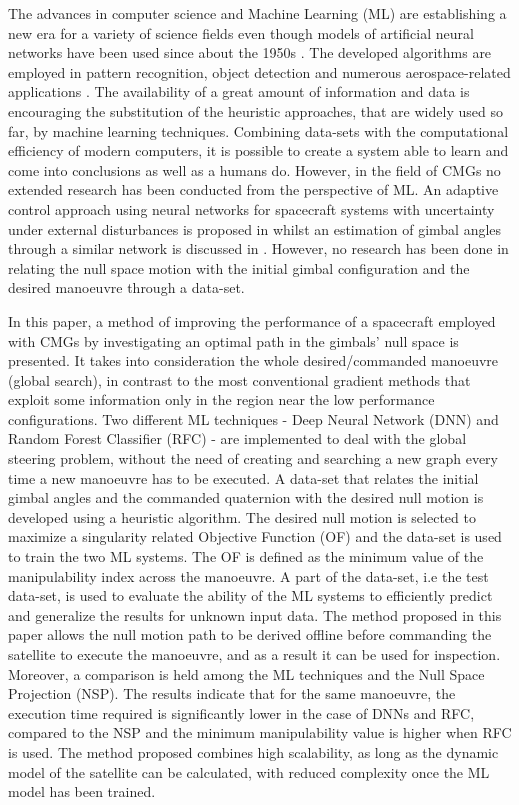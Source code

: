 \documentclass[aerospace,article,submit,moreauthors,dvi2pdf]{Definitions/mdpi}
\begin{document}
The advances in computer science and Machine Learning (ML) are establishing a new era for a variety of science fields even though models of artificial neural networks have been used since about the 1950s \cite{rosenblatt}. The developed algorithms are employed in pattern recognition, object detection and numerous aerospace-related applications \cite{pritmark,Cornejo,Ferreira}.  The availability of a great amount of information and data is encouraging the substitution of the heuristic approaches, that are widely used so far, by machine learning techniques. Combining data-sets with the computational efficiency of modern computers, it is possible to create a system able to learn and come into conclusions as well as a humans do. However, in the field of CMGs no extended research has been conducted from the perspective of ML. An adaptive control approach using neural networks for spacecraft systems with uncertainty under external disturbances is proposed in \cite{Leeghim} whilst an estimation of gimbal angles through a similar network is discussed in \cite{Zhong}. However, no research has been done in relating the null space motion with the initial gimbal configuration and the desired manoeuvre through a data-set. 

In this paper, a method of improving the performance of a spacecraft employed with CMGs by investigating an optimal path in the gimbals' null space is presented. It takes into consideration the whole desired/commanded manoeuvre (global search), in contrast to the most conventional gradient methods that exploit some information only in the region near the low performance configurations. Two different ML techniques - Deep Neural Network (DNN) and Random Forest Classifier (RFC) - are implemented to deal with the global steering problem, without the need of creating and searching a new graph every time a new manoeuvre has to be executed. A data-set that relates the initial gimbal angles and the commanded quaternion with the desired null motion is developed using a heuristic algorithm. The desired null motion is selected to maximize a singularity related Objective Function (OF) and the data-set is used to train the two ML systems. The OF is defined as the minimum value of the manipulability index across the manoeuvre. A part of the data-set, i.e the test data-set, is used to evaluate the ability of the ML systems to efficiently predict and generalize the results for unknown input data. The method proposed in this paper allows the null motion path to be derived offline before commanding the satellite to execute the manoeuvre, and as a result it can be used for inspection. Moreover, a comparison is held among the ML techniques and the Null Space Projection (NSP). The results indicate that for the same manoeuvre, the execution time required is significantly lower in the case of DNNs and RFC, compared to the NSP and the minimum manipulability value is higher when RFC is used. The method proposed combines high scalability, as long as the dynamic model of the satellite can be calculated, with reduced complexity once the ML model has been trained.
\end{document}
